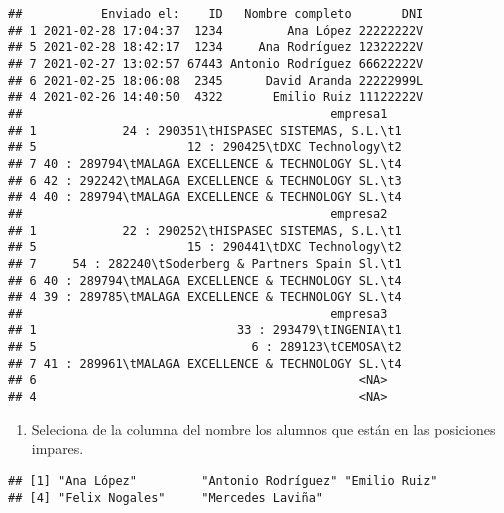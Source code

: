 \documentclass[
]{book}
\newenvironment{Shaded}{\begin{snugshade}}{\end{snugshade}}
\newcommand{\AttributeTok}[1]{\textcolor[rgb]{0.77,0.63,0.00}{#1}}
\newcommand{\ConstantTok}[1]{\textcolor[rgb]{0.00,0.00,0.00}{#1}}
\newcommand{\FunctionTok}[1]{\textcolor[rgb]{0.00,0.00,0.00}{#1}}
\newcommand{\NormalTok}[1]{#1}
\newcommand{\SpecialCharTok}[1]{\textcolor[rgb]{0.00,0.00,0.00}{#1}}
\newcommand{\StringTok}[1]{\textcolor[rgb]{0.31,0.60,0.02}{#1}}
\providecommand{\tightlist}{%
  \setlength{\itemsep}{0pt}\setlength{\parskip}{0pt}}
\begin{document}
\begin{verbatim}
##           Enviado el:    ID   Nombre completo       DNI
## 1 2021-02-28 17:04:37  1234         Ana López 22222222V
## 5 2021-02-28 18:42:17  1234     Ana Rodríguez 12322222V
## 7 2021-02-27 13:02:57 67443 Antonio Rodríguez 66622222V
## 6 2021-02-25 18:06:08  2345      David Aranda 22222999L
## 4 2021-02-26 14:40:50  4322       Emilio Ruiz 11122222V
##                                           empresa1
## 1            24 : 290351\tHISPASEC SISTEMAS, S.L.\t1
## 5                     12 : 290425\tDXC Technology\t2
## 7 40 : 289794\tMALAGA EXCELLENCE & TECHNOLOGY SL.\t4
## 6 42 : 292242\tMALAGA EXCELLENCE & TECHNOLOGY SL.\t3
## 4 40 : 289794\tMALAGA EXCELLENCE & TECHNOLOGY SL.\t4
##                                           empresa2
## 1            22 : 290252\tHISPASEC SISTEMAS, S.L.\t1
## 5                     15 : 290441\tDXC Technology\t2
## 7     54 : 282240\tSoderberg & Partners Spain Sl.\t1
## 6 40 : 289794\tMALAGA EXCELLENCE & TECHNOLOGY SL.\t4
## 4 39 : 289785\tMALAGA EXCELLENCE & TECHNOLOGY SL.\t4
##                                           empresa3
## 1                            33 : 293479\tINGENIA\t1
## 5                              6 : 289123\tCEMOSA\t2
## 7 41 : 289961\tMALAGA EXCELLENCE & TECHNOLOGY SL.\t4
## 6                                             <NA>
## 4                                             <NA>
\end{verbatim}

\begin{enumerate}
\def\labelenumi{\arabic{enumi}.}
\setcounter{enumi}{9}
\tightlist
\item
  Seleciona de la columna del nombre los alumnos que están en las posiciones impares.
\end{enumerate}

\begin{Shaded}
\end{Shaded}

\begin{verbatim}
## [1] "Ana López"         "Antonio Rodríguez" "Emilio Ruiz"      
## [4] "Felix Nogales"     "Mercedes Laviña"
\end{verbatim}
\end{document}
